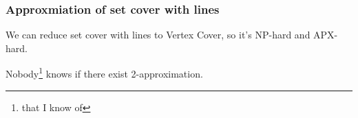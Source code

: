 \documentclass{beamer}
\begin{document}
\begin{frame}
\frametitle{Approxmiation of set cover with lines}
We can reduce set cover with lines to Vertex Cover, so it's
NP-hard and APX-hard.

Nobody\footnote{that I know of} knows if there exist 2-approximation.

\end{frame}


\end{document}
